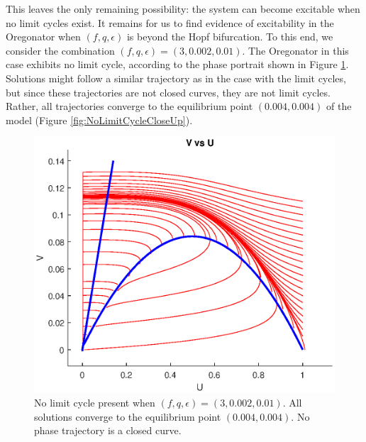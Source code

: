 \documentclass[twocolumn,amsmath,amssymb,aps]{revtex4}
\begin{document}
This leaves the only remaining possibility: the system  can become excitable when no limit cycles exist. It remains for us to find evidence of excitability in the Oregonator when $(f,q,\epsilon)$ is beyond the Hopf bifurcation. To this end, we consider the combination $(f,q,\epsilon) = (3,0.002, 0.01)$. The Oregonator in this case exhibits no limit cycle, according to the phase portrait shown in Figure \ref{fig:NoLimitCycle}. Solutions might follow a similar trajectory as in the case with the limit cycles, but since these trajectories are not closed curves, they are not limit cycles. Rather, all trajectories converge to the equilibrium point $(0.004,0.004)$ of the model (Figure \ref{fig:NoLimitCycleCloseUp}). 
\begin{figure}[!htb]
	\centering
	\includegraphics[scale=0.6]{no_limit_cycle.eps}
	\caption{No limit cycle present when $(f,q,\epsilon) = (3,0.002, 0.01)$. All solutions converge to the equilibrium point $(0.004,0.004)$. No phase trajectory is a closed curve.}
	\label{fig:NoLimitCycle}
\end{figure}
\end{document}
